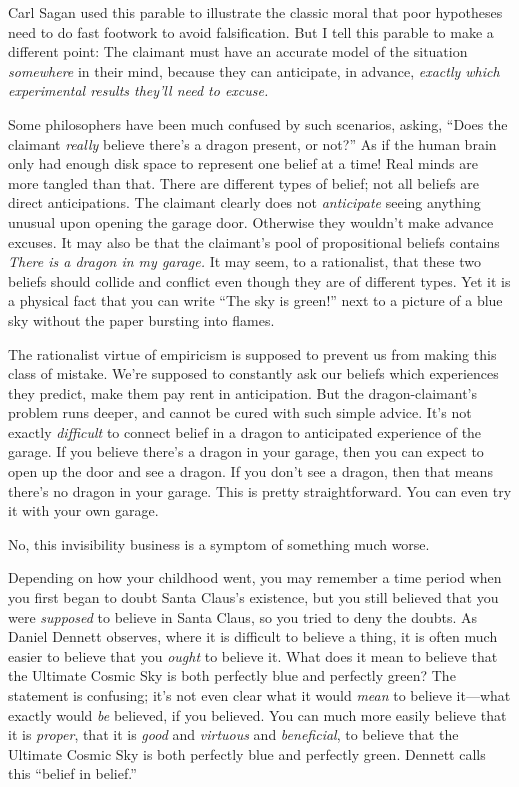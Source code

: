 {
 Carl Sagan used this parable to illustrate the classic moral that
poor hypotheses need to do fast footwork to avoid falsification. But I
tell this parable to make a different point: The claimant must have an
accurate model of the situation \textit{somewhere} in their mind,
because they can anticipate, in advance, \textit{exactly which
experimental results they'll need to excuse.}}

{
 Some philosophers have been much confused by such scenarios,
asking, ``Does the claimant \textit{really} believe
there's a dragon present, or not?''
As if the human brain only had enough disk space to represent one
belief at a time! Real minds are more tangled than that. There are
different types of belief; not all beliefs are direct anticipations.
The claimant clearly does not \textit{anticipate} seeing anything
unusual upon opening the garage door. Otherwise they
wouldn't make advance excuses. It may also be that the
claimant's pool of propositional beliefs contains
\textit{There is a dragon in my garage.} It may seem, to a rationalist,
that these two beliefs should collide and conflict even though they are
of different types. Yet it is a physical fact that you can write
``The sky is green!'' next to a
picture of a blue sky without the paper bursting into flames.}

{
 The rationalist virtue of empiricism is supposed to prevent us
from making this class of mistake. We're supposed to
constantly ask our beliefs which experiences they predict, make them
pay rent in anticipation. But the dragon-claimant's
problem runs deeper, and cannot be cured with such simple advice.
It's not exactly \textit{difficult} to connect belief
in a dragon to anticipated experience of the garage. If you believe
there's a dragon in your garage, then you can expect to
open up the door and see a dragon. If you don't see a
dragon, then that means there's no dragon in your
garage. This is pretty straightforward. You can even try it with your
own garage.}

{
 No, this invisibility business is a symptom of something much
worse.}

{
 Depending on how your childhood went, you may remember a time
period when you first began to doubt Santa Claus's
existence, but you still believed that you were \textit{supposed} to
believe in Santa Claus, so you tried to deny the doubts. As Daniel
Dennett observes, where it is difficult to believe a thing, it is often
much easier to believe that you \textit{ought} to believe it. What does
it mean to believe that the Ultimate Cosmic Sky is both perfectly blue
and perfectly green? The statement is confusing; it's
not even clear what it would \textit{mean} to believe it---what exactly
would \textit{be} believed, if you believed. You can much more easily
believe that it is \textit{proper}, that it is \textit{good} and
\textit{virtuous} and \textit{beneficial}, to believe that the Ultimate
Cosmic Sky is both perfectly blue and perfectly green. Dennett calls
this ``belief in
belief.''}

